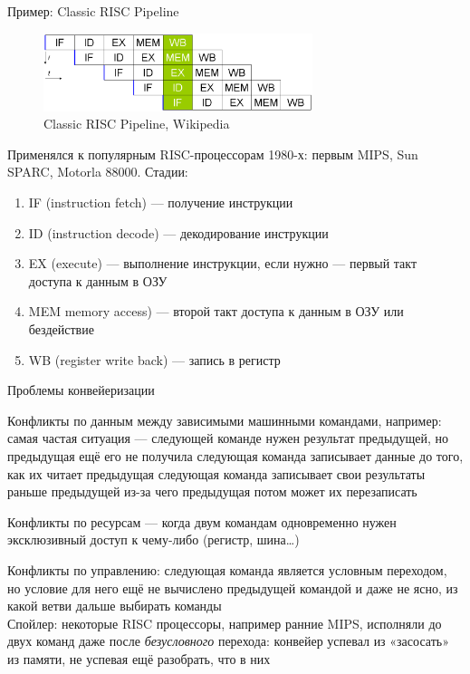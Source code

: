 \documentclass[xetex,aspectratio=43]{beamer}
\begin{document}
\begin{frame}{Пример: Classic RISC Pipeline}
    \begin{figure}
        \includegraphics[width=0.7\textwidth]{img/11.classic-RISC-pipeline.png}
        \caption{Classic RISC Pipeline, Wikipedia}
    \end{figure}
    Применялся к популярным RISC-процессорам 1980-х: первым MIPS, Sun SPARC, Motorla 88000.
    Стадии:
    \begin{enumerate}
        \tightlist
        \item IF (instruction fetch) — получение инструкции
        \item ID (instruction decode) — декодирование инструкции
        \item EX (execute) — выполнение инструкции, если нужно — первый такт доступа к данным в ОЗУ
        \item MEM memory access) — второй такт доступа к данным в ОЗУ или бездействие
        \item WB (register write back) — запись в регистр
    \end{enumerate}
\end{frame}

\begin{frame}{Проблемы конвейеризации}
    \begin{outline}[enumerate]
        \renewcommand{\outlineii}{itemize}
        \1 Конфликты по данным между зависимыми машинными командами, например:
            \2 самая частая ситуация — следующей команде нужен результат предыдущей, но предыдущая ещё его не получила
            \2 следующая команда записывает данные до того, как их читает предыдущая
            \2 следующая команда записывает свои результаты раньше предыдущей из-за чего предыдущая потом может их перезаписать

        \1 Конфликты по ресурсам — когда двум командам одновременно нужен эксклюзивный доступ к чему-либо (регистр, шина\ldots)

        \1 Конфликты по управлению: следующая команда является условным переходом, но условие для него ещё не вычислено предыдущей командой
            \2 и даже не ясно, из какой ветви дальше выбирать команды
            \pause\\
            \alert{Спойлер: некоторые RISC процессоры, например ранние MIPS, исполняли до двух команд даже после \emph{безусловного} перехода: конвейер успевал из «засосать» из памяти, не успевая ещё разобрать, что в них}
    \end{outline}
\end{frame}
\end{document}
